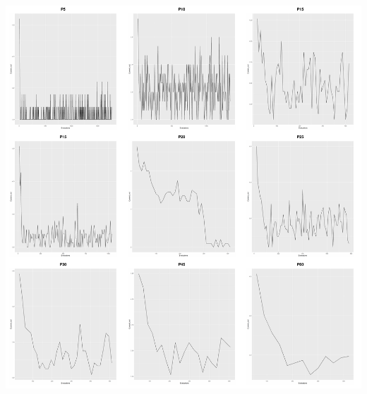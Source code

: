 \documentclass[eu,gi]{ifirak}\usepackage[]{graphicx}\usepackage[]{color}
\makeatletter
\def\maxwidth{ %
  \ifdim\Gin@nat@width>\linewidth
    \linewidth
  \else
    \Gin@nat@width
  \fi
}
\newenvironment{knitrout}{}{} %
\makeatother
\begin{document}
\begin{center}	
\begin{knitrout}
\color{fgcolor}
\includegraphics[width=\maxwidth]{figure/unnamed-chunk-19-1} 

\end{knitrout}
\end{center}
\end{document}
